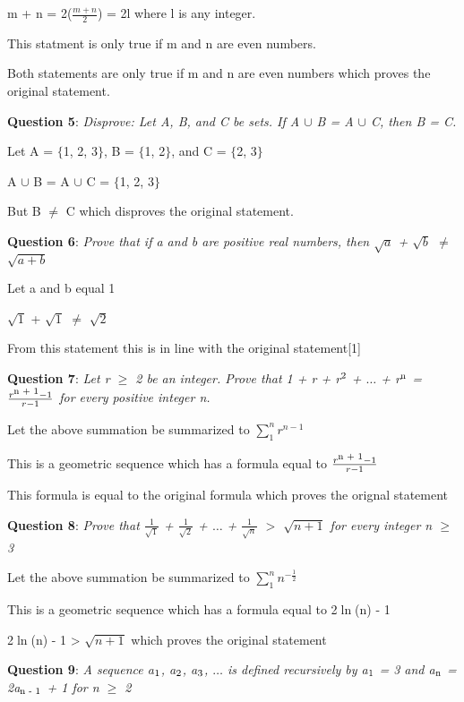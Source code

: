 \documentclass{article} %
\newcommand{\question}[2][]{\begin{flushleft}
        \textbf{Question #1}: \textit{#2}

\end{flushleft}}
\begin{document}
    m + n = 2($\frac{m + n}{2}$) = 2l where l is any integer.

    This statment is only true if m and n are even numbers.

    Both statements are only true if m and n are even numbers which proves the original statement.

    \question[5]{Disprove: Let A, B, and C be sets. If A $\cup$ B = A $\cup$ C, then B = C.}

    Let A = $\{$1, 2, 3$\}$, B = $\{$1, 2$\}$, and C = $\{$2, 3$\}$

    A $\cup$ B = A $\cup$ C = $\{$1, 2, 3$\}$

    But B $\neq$ C which disproves the original statement.

    \question[6]{Prove that if a and b are positive real numbers, then $\sqrt{a}$ + $\sqrt{b}$ $\neq$ $\sqrt{a + b}$}

    Let a and b equal 1

    $\sqrt{1}$ + $\sqrt{1}$ $\neq$ $\sqrt{2}$
    
    From this statement this is in line with the original statement[1]

    \question[7]{Let r $\geq$ 2 be an integer. Prove that 1 + r + r$\textsuperscript{2}$ + $\dots$ + r$\textsuperscript{n}$ = $\frac{r\textsuperscript{n + 1} - 1}{r - 1}$ for every positive integer n.}

    Let the above summation be summarized to $\sum_{1}^{n} r^{n - 1}$

    This is a geometric sequence which has a formula equal to $\frac{r\textsuperscript{n + 1} - 1}{r - 1}$

    This formula is equal to the original formula which proves the orignal statement

    \question[8]{Prove that $\frac{1}{\sqrt{1}}$ + $\frac{1}{\sqrt{2}}$ + $\dots$ + $\frac{1}{\sqrt{n}}$ $>$ $\sqrt{n + 1}$ for every integer n $\geq$ 3}

    Let the above summation be summarized to $\sum_{1}^{n} n^{{-\frac{1}{2}}}$

    This is a geometric sequence which has a formula equal to 2$\ln$(n) - 1

    2$\ln$(n) - 1 > $\sqrt{n + 1}$ which proves the original statement

    \question[9]{A sequence a$\textsubscript{1}$, a$\textsubscript{2}$, a$\textsubscript{3}$, $\dots$ is defined recursively by a$\textsubscript{1}$ = 3 and a$\textsubscript{n}$ = 2a$\textsubscript{n - 1}$ + 1 for n $\geq$ 2}
\end{document}
